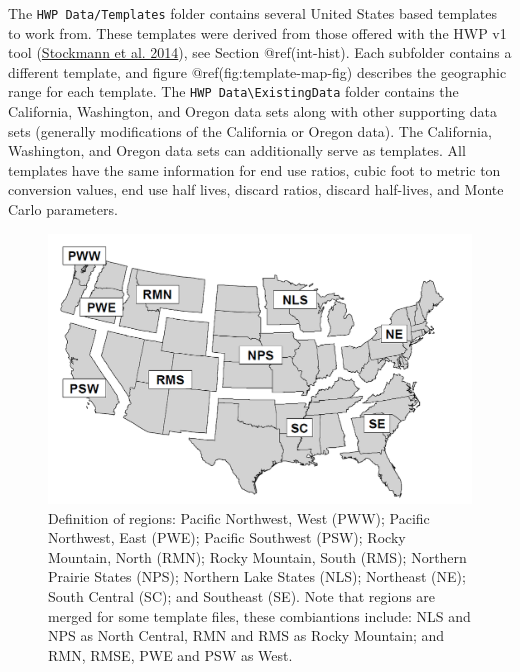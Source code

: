 \documentclass[
  openany]{book}
\begin{document}
The \texttt{HWP\ Data/Templates} folder contains several United States
based templates to work from. These templates were derived from those
offered with the HWP v1 tool
(\protect\hyperlink{ref-stockmann2014}{Stockmann et al. 2014}), see
Section @ref(int-hist). Each subfolder contains a different template,
and figure @ref(fig:template-map-fig) describes the geographic range for
each template. The \texttt{HWP\ Data\textbackslash{}ExistingData} folder
contains the California, Washington, and Oregon data sets along with
other supporting data sets (generally modifications of the California or
Oregon data). The California, Washington, and Oregon data sets can
additionally serve as templates. All templates have the same information
for end use ratios, cubic foot to metric ton conversion values, end use
half lives, discard ratios, discard half-lives, and Monte Carlo
parameters.

\begin{figure}
\includegraphics[width=1\linewidth]{images/regions_map} \caption{Definition of regions: Pacific Northwest, West (PWW); Pacific Northwest, East (PWE); Pacific Southwest (PSW); Rocky Mountain, North (RMN); Rocky Mountain, South (RMS); Northern Prairie States (NPS); Northern Lake States (NLS); Northeast (NE); South Central (SC); and Southeast (SE).  Note that regions are merged for some template files, these combiantions include: NLS and NPS as North Central, RMN and RMS as Rocky Mountain; and RMN, RMSE, PWE and PSW as West.}\label{fig:template-map-fig}
\end{figure}
\end{document}
